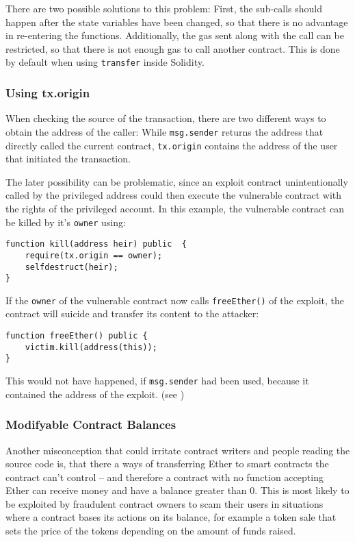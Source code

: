 There are two possible solutions to this problem: First, the sub-calls should happen after the state variables have been changed, so that there is no advantage in re-entering the functions. Additionally, the gas sent along with the call can be restricted, so that there is not enough gas to call another contract. This is done by default when using \texttt{transfer} inside Solidity.



\subsubsection{Using tx.origin}
When checking the source of the transaction, there are two different ways to obtain the address of the caller: While \texttt{msg.sender} returns the address that directly called the current contract, \texttt{tx.origin} contains the address of the user that initiated the transaction.

The later possibility can be problematic, since an exploit contract unintentionally called by the privileged address could then execute the vulnerable contract with the rights of the privileged account. In this example, the vulnerable contract can be killed by it's \texttt{owner} using:
\begin{verbatim}
function kill(address heir) public  {
    require(tx.origin == owner);
    selfdestruct(heir);
}
\end{verbatim}

If the \texttt{owner} of the vulnerable contract now calls \texttt{freeEther()} of the exploit, the contract will suicide and transfer its content to the attacker:
\begin{verbatim}
function freeEther() public {
    victim.kill(address(this));
}
\end{verbatim}

This would not have happened, if \texttt{msg.sender} had been used, because it contained the address of the exploit. (see \cite[Security Considerations; tx.origin]{ethereum:solidity})

\subsubsection{Modifyable Contract Balances}
Another misconception that could irritate contract writers and people reading the source code is, that there a ways of transferring Ether to smart contracts the contract can't control -- and therefore a contract with no function accepting Ether can receive money and have a balance greater than \( 0 \). This is most likely to be exploited by fraudulent contract owners to scam their users in situations where a contract bases its actions on its balance, for example a token sale that sets the price of the tokens depending on the amount of funds raised.

